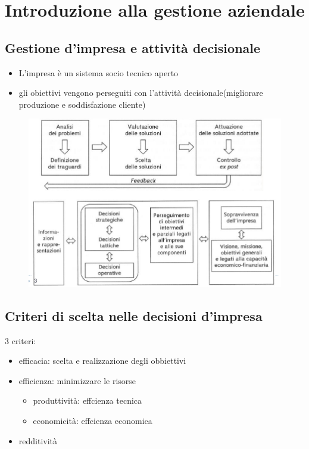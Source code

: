 \section{Introduzione alla gestione aziendale}
\subsection{Gestione d'impresa e attività decisionale}


\begin{itemize}
    \item L'impresa è un sistema socio tecnico aperto
    \item gli obiettivi vengono perseguiti con l'attività decisionale(migliorare produzione e soddisfazione cliente)
\end{itemize}

\begin{figure}[H]
    \centering
    \includegraphics[width=0.7\linewidth]{1/img/Screenshot from 2022-07-03 11-30-16.png}
\end{figure}

\subsection{Criteri di scelta nelle decisioni d'impresa}


3 criteri:
\begin{itemize}
    \item efficacia: scelta e realizzazione degli obbiettivi
    \item efficienza: minimizzare le risorse
        \begin{itemize}
            \item produttività: effcienza tecnica
            \item economicità: effcienza economica
        \end{itemize}
    \item redditività
\end{itemize}


